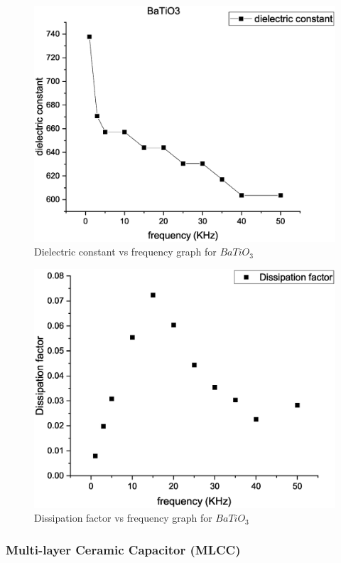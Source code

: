 			
			\begin{figure}[H]
				\centering
				\label{graph:1}
				\includegraphics[width=0.8\columnwidth]{images/G1.eps}
				\caption{Dielectric constant vs frequency graph for $BaTiO_3$}
			\end{figure}
			\begin{figure}[H]
				\centering
				\label{graph:2}
				\includegraphics[width=0.8\columnwidth]{images/g2.eps}
				\caption{Dissipation factor vs frequency graph for $BaTiO_3$}
			\end{figure}
		\subsubsection{Multi-layer Ceramic Capacitor (MLCC)}

